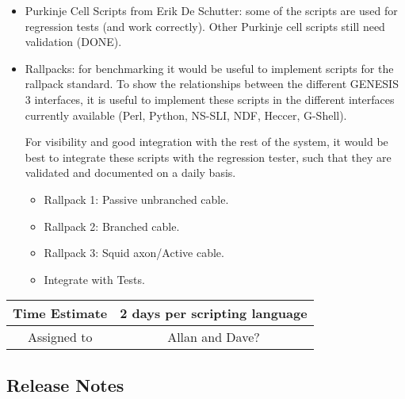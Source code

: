\documentclass[12pt]{article}
\begin{document}
\begin{itemize}
\item Purkinje Cell Scripts from Erik De Schutter: some of the scripts
  are used for regression tests (and work correctly).  Other Purkinje
  cell scripts still need validation (DONE).
\item Rallpacks: for benchmarking it would be useful to implement
  scripts for the rallpack standard.  To show the relationships
  between the different GENESIS\,3 interfaces, it is useful to
  implement these scripts in the different interfaces currently
  available (Perl, Python, NS-SLI, NDF, Heccer, G-Shell).

  For visibility and good integration with the rest of the system, it
  would be best to integrate these scripts with the regression tester,
  such that they are validated and documented on a daily basis.
  \begin{itemize}
  \item Rallpack 1: Passive unbranched cable.
  \item Rallpack 2: Branched cable.
  \item Rallpack 3: Squid axon/Active cable.
  \item Integrate with Tests.
  \end{itemize}
\end{itemize}

\begin{center}
  \vspace{5mm}
  \centering
  \begin{tabular}{|c|c|}
    \hline
    Time Estimate
    & 2 days per scripting language \\
    \hline
    Assigned to
    & Allan and Dave? \\
    \hline
  \end{tabular}
\end{center}


\subsection{Release Notes}
\end{document}
